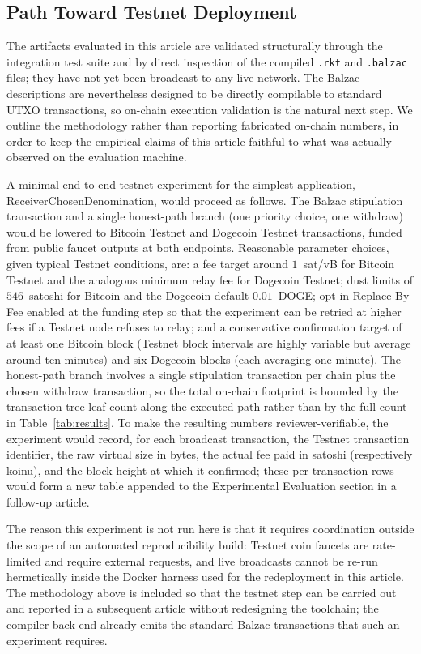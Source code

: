 \documentclass[journal]{IEEEtran}
\begin{document}
\subsection{Path Toward Testnet Deployment}
\label{sec:testnet}

The artifacts evaluated in this article are validated structurally through the integration test suite and by direct inspection of the compiled \texttt{.rkt} and \texttt{.balzac} files; they have not yet been broadcast to any live network. The Balzac descriptions are nevertheless designed to be directly compilable to standard UTXO transactions, so on-chain execution validation is the natural next step. We outline the methodology rather than reporting fabricated on-chain numbers, in order to keep the empirical claims of this article faithful to what was actually observed on the evaluation machine.

A minimal end-to-end testnet experiment for the simplest application, ReceiverChosenDenomination, would proceed as follows. The Balzac stipulation transaction and a single honest-path branch (one priority choice, one withdraw) would be lowered to Bitcoin Testnet and Dogecoin Testnet transactions, funded from public faucet outputs at both endpoints. Reasonable parameter choices, given typical Testnet conditions, are: a fee target around $1$~sat/vB for Bitcoin Testnet and the analogous minimum relay fee for Dogecoin Testnet; dust limits of $546$~satoshi for Bitcoin and the Dogecoin-default $0.01$~DOGE; opt-in Replace-By-Fee enabled at the funding step so that the experiment can be retried at higher fees if a Testnet node refuses to relay; and a conservative confirmation target of at least one Bitcoin block (Testnet block intervals are highly variable but average around ten minutes) and six Dogecoin blocks (each averaging one minute). The honest-path branch involves a single stipulation transaction per chain plus the chosen withdraw transaction, so the total on-chain footprint is bounded by the transaction-tree leaf count along the executed path rather than by the full count in Table~\ref{tab:results}. To make the resulting numbers reviewer-verifiable, the experiment would record, for each broadcast transaction, the Testnet transaction identifier, the raw virtual size in bytes, the actual fee paid in satoshi (respectively koinu), and the block height at which it confirmed; these per-transaction rows would form a new table appended to the Experimental Evaluation section in a follow-up article.

The reason this experiment is not run here is that it requires coordination outside the scope of an automated reproducibility build: Testnet coin faucets are rate-limited and require external requests, and live broadcasts cannot be re-run hermetically inside the Docker harness used for the redeployment in this article. The methodology above is included so that the testnet step can be carried out and reported in a subsequent article without redesigning the toolchain; the compiler back end already emits the standard Balzac transactions that such an experiment requires.
\end{document}

